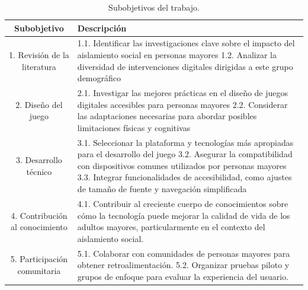\begin{table}[ht]
  \centering
  \begin{tabular}{| c | p{9.6cm} |}
    \hline
    \textbf{Subobjetivo} & \textbf{Descripción} \\
    \hline
    1. Revisión de la literatura & 
        1.1. Identificar las investigaciones clave sobre el impacto del aislamiento social en personas mayores \newline
        \vspace{0.2cm}
        1.2. Analizar la diversidad de intervenciones digitales dirigidas a este grupo demográfico \vspace{0.2cm} \\
    \hline
    2. Diseño del juego &
        2.1. Investigar las mejores prácticas en el diseño de juegos digitales accesibles para personas mayores \newline
        \vspace{0.2cm}
        2.2. Considerar las adaptaciones necesarias para abordar posibles limitaciones físicas y cognitivas
        \vspace{0.2cm} \\
    \hline
    3. Desarrollo técnico & 
        3.1. Seleccionar la plataforma y tecnologías más apropiadas para el desarrollo del juego \newline
        \vspace{0.2cm}
        3.2. Asegurar la compatibilidad con dispositivos comunes utilizados por personas mayores \newline
        \vspace{0.2cm}
        3.3. Integrar funcionalidades de accesibilidad, como ajustes de tamaño de fuente y navegación simplificada \vspace{0.2cm} \\
    \hline
    4. Contribución al conocimiento & 
    4.1. Contribuir al creciente cuerpo de conocimientos sobre cómo la tecnología puede mejorar la calidad de vida de los adultos mayores, particularmente en el contexto del aislamiento social. 
    \vspace{0.2cm} \\
    \hline
    5. Participación comunitaria & 
        5.1. Colaborar con comunidades de personas mayores para obtener retroalimentación. \newline
        \vspace{0.2cm}
        5.2. Organizar pruebas piloto y grupos de enfoque para evaluar la experiencia del usuario. \vspace{0.2cm} \\
    \hline
    \end{tabular}
  \caption{Subobjetivos del trabajo.}
  \label{tab:subobjetivos}
\end{table}